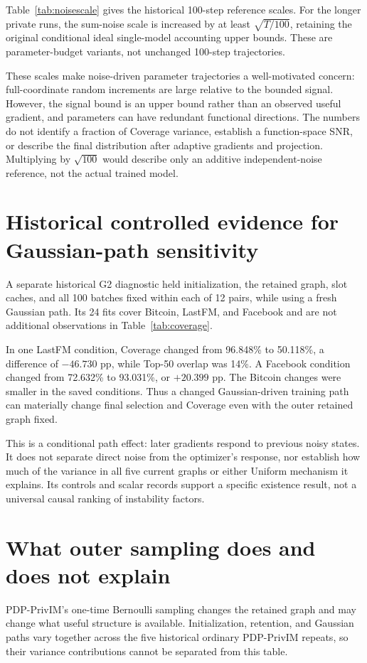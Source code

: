 Table~\ref{tab:noisescale} gives the historical 100-step reference scales. For the longer private runs, the sum-noise scale is increased by at least $\sqrt{T/100}$, retaining the original conditional ideal single-model accounting upper bounds. These are parameter-budget variants, not unchanged 100-step trajectories.

These scales make noise-driven parameter trajectories a well-motivated concern: full-coordinate random increments are large relative to the bounded signal. However, the signal bound is an upper bound rather than an observed useful gradient, and parameters can have redundant functional directions. The numbers do not identify a fraction of Coverage variance, establish a function-space SNR, or describe the final distribution after adaptive gradients and projection. Multiplying by $\sqrt{100}$ would describe only an additive independent-noise reference, not the actual trained model.

\section{Historical controlled evidence for Gaussian-path sensitivity}
A separate historical G2 diagnostic held initialization, the retained graph, slot caches, and all 100 batches fixed within each of 12 pairs, while using a fresh Gaussian path. Its 24 fits cover Bitcoin, LastFM, and Facebook and are not additional observations in Table~\ref{tab:coverage}.

In one LastFM condition, Coverage changed from 96.848\% to 50.118\%, a difference of $-46.730$ pp, while Top-50 overlap was 14\%. A Facebook condition changed from 72.632\% to 93.031\%, or $+20.399$ pp. The Bitcoin changes were smaller in the saved conditions. Thus a changed Gaussian-driven training path can materially change final selection and Coverage even with the outer retained graph fixed.

This is a conditional path effect: later gradients respond to previous noisy states. It does not separate direct noise from the optimizer's response, nor establish how much of the variance in all five current graphs or either Uniform mechanism it explains. Its controls and scalar records support a specific existence result, not a universal causal ranking of instability factors.

\section{What outer sampling does and does not explain}
PDP-PrivIM's one-time Bernoulli sampling changes the retained graph and may change what useful structure is available. Initialization, retention, and Gaussian paths vary together across the five historical ordinary PDP-PrivIM repeats, so their variance contributions cannot be separated from this table.

